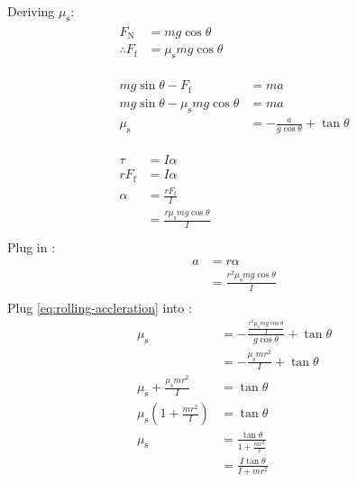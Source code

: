 \documentclass[a4paper, titlepage]{book}
\begin{document}
Deriving \(\mu_\mathrm{s}\):
\begin{gather}
    \begin{aligned}
        F_\mathrm{N} &= m g \cos\theta \\
        \therefore F_\mathrm{f} &= \mu_\mathrm{s} m g \cos\theta \\
    \end{aligned} \\
    \nonumber \\
    \begin{aligned} \label{eq:rolling-static-friction}
        m g \sin\theta - F_\mathrm{f} &= m a \\
        m g \sin\theta - \mu_\mathrm{s} m g \cos\theta &= m a \\
        \mu_\mathrm{s} &= - \frac{a}{g \cos\theta} + \tan\theta \\
    \end{aligned} \\
    \nonumber \\
    \begin{aligned} \label{eq:rolling-angular-accleration}
        \tau &= I \alpha \\
        r F_\mathrm{f} &= I \alpha \\
        \alpha &= \frac{r F_\mathrm{f}}{I} \\
        &= \frac{r \mu_\mathrm{s} m g \cos\theta}{I} \\
    \end{aligned}
\end{gather}
Plug in :
\begin{equation}
    \begin{aligned} \label{eq:rolling-accleration}
        a &= r \alpha \\
        &= \frac{r^2 \mu_\mathrm{s} m g \cos\theta}{I} \\
    \end{aligned}
\end{equation}
Plug \cref{eq:rolling-accleration} into :
\begin{equation}
    \begin{aligned}
        \mu_\mathrm{s} &= - \frac{
                            \frac{r^2 \mu_\mathrm{s} m g \cos\theta}{I}
                        }
                        {g \cos\theta}
                        + \tan\theta \\
        &= - \frac{\mu_\mathrm{s} m r^2}{I} + \tan\theta \\
        \mu_\mathrm{s} + \frac{\mu_\mathrm{s} m r^2}{I} &= \tan\theta \\
        \mu_\mathrm{s} \left( 1 + \frac{m r^2}{I} \right) &= \tan\theta \\
        \mu_\mathrm{s} &= \frac{\tan\theta}{1 + \frac{m r^2}{I}} \\
        &= \frac{I \tan\theta}{I + m r^2}
    \end{aligned}
\end{equation}
\end{document}
